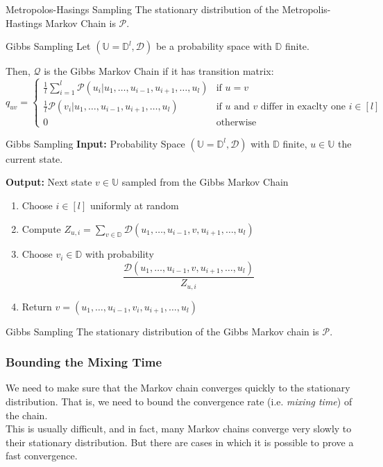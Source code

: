 \documentclass[english]{panikzettel}
\begin{document}
\begin{theo}{Metropolos-Hasings Sampling}
The stationary distribution of the Metropolis-Hastings Markov Chain is $\mathcal{P}$.
\end{theo}

\begin{defi}{Gibbs Sampling}
Let $(\mathbb{U} = \mathbb{D}^l, \mathcal{D})$ be a probability space with $\mathbb{D}$ finite.

Then, $\mathcal{Q}$ is the Gibbs Markov Chain if it has transition matrix:
$$
q_{uv} =
\begin{cases}
\frac{1}{l} \sum_{i=1}^l \mathcal{P}(u_i| u_1, \ldots, u_{i-1}, u_{i+1}, \ldots, u_l) & \text{if } u = v \\
\frac{1}{l} \mathcal{P}(v_i| u_1, \ldots, u_{i-1}, u_{i+1}, \ldots, u_l) & \text{if $u$ and $v$ differ in exaclty one } i \in [l] \\
0 & \text{otherwise}
\end{cases}
$$
\end{defi}

\begin{algo}{Gibbs Sampling}
\textbf{Input:} Probability Space $(\mathbb{U} = \mathbb{D}^l, \mathcal{D})$ with $\mathbb{D}$ finite, $u\in\mathbb{U}$ the current state.

\textbf{Output:} Next state $v\in\mathbb{U}$ sampled from the Gibbs Markov Chain
\tcblower
\begin{enumerate}
    \item Choose $i \in [l]$ uniformly at random
    \item Compute $Z_{u,i} = \sum_{v \in \mathbb{D}} \mathcal{D}(u_1, \ldots, u_{i-1}, v, u_{i+1}, \ldots, u_l)$
    \item Choose $v_i \in \mathbb{D}$ with probability
$$
\frac{\mathcal{D}(u_1, \ldots, u_{i-1}, v, u_{i+1}, \ldots, u_l)}{Z_{u,i}}
$$
    \item Return $v = (u_1, \ldots, u_{i-1}, v_i, u_{i+1}, \ldots, u_l)$
\end{enumerate}
\end{algo}

\begin{theo}{Gibbs Sampling}
The stationary distribution of the Gibbs Markov chain is $\mathcal{P}$.
\end{theo}

\subsubsection{Bounding the Mixing Time}
We need to make sure that the Markov chain converges quickly to the stationary distribution.
That is, we need to bound the convergence rate (i.e. \emph{mixing time}) of the chain.\\
This is usually difficult, and in fact, many Markov chains converge very slowly to their stationary distribution. But there are cases in which it is possible to prove a fast convergence.
\end{document}
